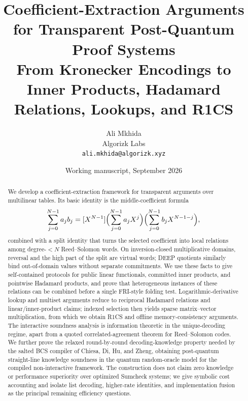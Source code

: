 \documentclass[11pt]{article}
\title{\textbf{Coefficient-Extraction Arguments for Transparent Post-Quantum Proof Systems}\\
\large From Kronecker Encodings to Inner Products, Hadamard Relations, Lookups, and R1CS}
\author{Ali Mkhida\\Algorizk Labs\\\texttt{ali.mkhida@algorizk.xyz}}
\date{Working manuscript, September 2026}
\begin{document}
\maketitle

\begin{abstract}
We develop a coefficient-extraction framework for transparent arguments over multilinear tables.  Its basic identity is the middle-coefficient formula
\[
  \sum_{j=0}^{N-1}a_jb_j
  =[X^{N-1}]\Bigl(\sum_{j=0}^{N-1}a_jX^j\Bigr)
                  \Bigl(\sum_{j=0}^{N-1}b_jX^{N-1-j}\Bigr),
\]
combined with a split identity that turns the selected coefficient into local relations among degree-$<N$ Reed--Solomon words.  On inversion-closed multiplicative domains, reversal and the high part of the split are virtual words; DEEP quotients similarly bind out-of-domain values without separate commitments.  We use these facts to give self-contained protocols for public linear functionals, committed inner products, and pointwise Hadamard products, and prove that heterogeneous instances of these relations can be combined before a single FRI-style folding test.  Logarithmic-derivative lookup and multiset arguments reduce to reciprocal Hadamard relations and linear/inner-product claims; indexed selection then yields sparse matrix--vector multiplication, from which we obtain R1CS and offline memory-consistency arguments.  The interactive soundness analysis is information theoretic in the unique-decoding regime, apart from a quoted correlated-agreement theorem for Reed--Solomon codes.  We further prove the relaxed round-by-round decoding-knowledge property needed by the salted BCS compiler of Chiesa, Di, Hu, and Zheng, obtaining post-quantum straight-line knowledge soundness in the quantum random-oracle model for the compiled non-interactive framework.  The construction does not claim zero knowledge or performance superiority over optimized Sumcheck systems; we give symbolic cost accounting and isolate list decoding, higher-rate identities, and implementation fusion as the principal remaining efficiency questions.
\end{abstract}

\tableofcontents
























\printbibliography
\end{document}
